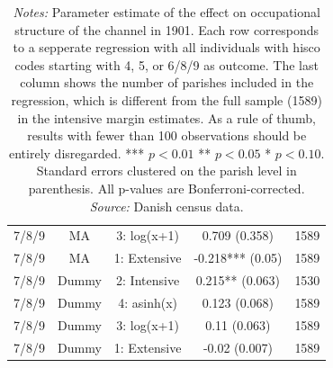 \begin{table}
\begin{tabular}{ccccc}
7/8/9 & MA & 3: log(x+1) & 0.709 (0.358) & 1589\\
7/8/9 & MA & 1: Extensive & -0.218*** (0.05) & 1589\\
7/8/9 & Dummy & 2: Intensive & 0.215** (0.063) & 1530\\
7/8/9 & Dummy & 4: asinh(x) & 0.123 (0.068) & 1589\\
7/8/9 & Dummy & 3: log(x+1) & 0.11 (0.063) & 1589\\
7/8/9 & Dummy & 1: Extensive & -0.02 (0.007) & 1589\\
\bottomrule
\end{tabular}
\parbox{0.9\textwidth}{
\caption*{\footnotesize \textit{Notes:} Parameter estimate of the effect on occupational structure of the channel in 1901. Each row corresponds to a sepperate regression with all individuals with hisco codes starting with 4, 5, or 6/8/9 as outcome. The last column shows the number of parishes included in the regression, which is different from the full sample (1589) in the intensive margin estimates. As a rule of thumb, results with fewer than 100 observations should be entirely disregarded. *** $p< 0.01$ ** $p< 0.05$ * $p< 0.10$. Standard errors clustered on the parish level in parenthesis. All p-values are Bonferroni-corrected. \\ \textit{Source:} Danish census data.}
}
\end{table}

\FloatBarrier

